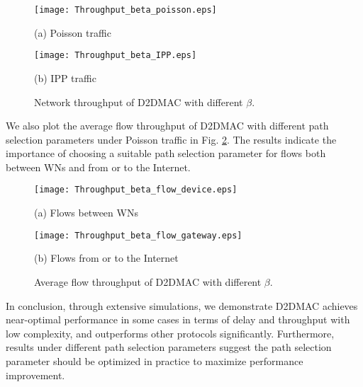 \documentclass[journal]{IEEEtran}
\begin{document}
\begin{figure}[htbp]
\begin{minipage}[t]{0.5\linewidth}
\centering
\texttt{[image: Throughput\_beta\_poisson.eps]}
\centerline{\small (a) Poisson traffic}
\end{minipage}\begin{minipage}[t]{0.5\linewidth}
\centering
\texttt{[image: Throughput\_beta\_IPP.eps]}
\centerline{\small (b) IPP traffic}
\end{minipage}\caption{Network throughput of D2DMAC with different $\beta$.}
\label{fig:Throughput_beta} \vspace*{-3mm}
\end{figure}


We also plot the average flow throughput of D2DMAC with different path selection parameters under
Poisson traffic in Fig. \ref{fig:Throughput_beta_poisson_flow}. The results indicate the importance
of choosing a suitable path selection parameter for flows both between WNs and from or to the
Internet.



\begin{figure}[htbp]
\begin{minipage}[t]{0.5\linewidth}
\centering
\texttt{[image: Throughput\_beta\_flow\_device.eps]}
\centerline{\small (a) Flows between WNs}
\end{minipage}\begin{minipage}[t]{0.5\linewidth}
\centering
\texttt{[image: Throughput\_beta\_flow\_gateway.eps]}
\centerline{\small (b) Flows from or to the Internet}
\end{minipage}\caption{Average flow throughput of D2DMAC with different $\beta$.}
\label{fig:Throughput_beta_poisson_flow} \vspace*{-3mm}
\end{figure}


In conclusion, through extensive simulations, we demonstrate D2DMAC achieves near-optimal
performance in some cases in terms of delay and throughput with low complexity, and outperforms other protocols
significantly. Furthermore, results under different path selection parameters suggest the path
selection parameter should be optimized in practice to maximize performance improvement.
\end{document}
